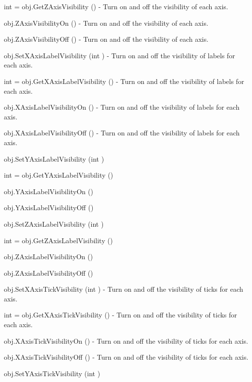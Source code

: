 \begin{DoxyItemize}
\item {\ttfamily int = obj.\-Get\-Z\-Axis\-Visibility ()} -\/ Turn on and off the visibility of each axis.  
\item {\ttfamily obj.\-Z\-Axis\-Visibility\-On ()} -\/ Turn on and off the visibility of each axis.  
\item {\ttfamily obj.\-Z\-Axis\-Visibility\-Off ()} -\/ Turn on and off the visibility of each axis.  
\item {\ttfamily obj.\-Set\-X\-Axis\-Label\-Visibility (int )} -\/ Turn on and off the visibility of labels for each axis.  
\item {\ttfamily int = obj.\-Get\-X\-Axis\-Label\-Visibility ()} -\/ Turn on and off the visibility of labels for each axis.  
\item {\ttfamily obj.\-X\-Axis\-Label\-Visibility\-On ()} -\/ Turn on and off the visibility of labels for each axis.  
\item {\ttfamily obj.\-X\-Axis\-Label\-Visibility\-Off ()} -\/ Turn on and off the visibility of labels for each axis.  
\item {\ttfamily obj.\-Set\-Y\-Axis\-Label\-Visibility (int )}  
\item {\ttfamily int = obj.\-Get\-Y\-Axis\-Label\-Visibility ()}  
\item {\ttfamily obj.\-Y\-Axis\-Label\-Visibility\-On ()}  
\item {\ttfamily obj.\-Y\-Axis\-Label\-Visibility\-Off ()}  
\item {\ttfamily obj.\-Set\-Z\-Axis\-Label\-Visibility (int )}  
\item {\ttfamily int = obj.\-Get\-Z\-Axis\-Label\-Visibility ()}  
\item {\ttfamily obj.\-Z\-Axis\-Label\-Visibility\-On ()}  
\item {\ttfamily obj.\-Z\-Axis\-Label\-Visibility\-Off ()}  
\item {\ttfamily obj.\-Set\-X\-Axis\-Tick\-Visibility (int )} -\/ Turn on and off the visibility of ticks for each axis.  
\item {\ttfamily int = obj.\-Get\-X\-Axis\-Tick\-Visibility ()} -\/ Turn on and off the visibility of ticks for each axis.  
\item {\ttfamily obj.\-X\-Axis\-Tick\-Visibility\-On ()} -\/ Turn on and off the visibility of ticks for each axis.  
\item {\ttfamily obj.\-X\-Axis\-Tick\-Visibility\-Off ()} -\/ Turn on and off the visibility of ticks for each axis.  
\item {\ttfamily obj.\-Set\-Y\-Axis\-Tick\-Visibility (int )}  

\end{DoxyItemize}
